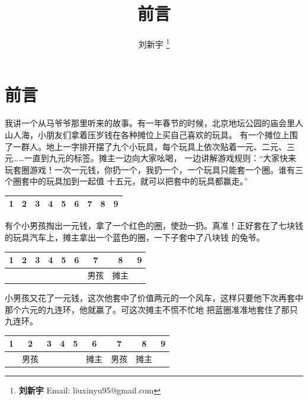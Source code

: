 \documentclass[UTF8]{article}
\begin{document}
\title{前言}

\author{刘新宇
\thanks{{\bfseries 刘新宇} \newline
  Email: liuxinyu95@gmail.com \newline}
  }

\maketitle
\fi


\chapter*{前言}

我讲一个从马爷爷那里听来的故事。有一年春节的时候，北京地坛公园的庙会里人山人海，小朋友们拿着压岁钱在各种摊位上买自己喜欢的玩具。
有一个摊位上围了一群人。地上一字排开摆了九个小玩具，每个玩具上依次贴着一元、二元、三元……一直到九元的标签。摊主一边向大家吆喝，
一边讲解游戏规则：“大家快来玩套圈游戏！一次一元钱，你扔一个，我扔一个，一个玩具只能套一个圈。谁有三个圈套中的玩具加到一起值
十五元，就可以把套中的玩具都赢走。”

\vspace{5mm}
\begin{tabular}{|c|c|c|c|c|c|c|c|c|}
\hline
1 & 2 & 3 & 4 & 5 & 6 & 7 & 8 & 9 \\
\hline
\end{tabular}
\vspace{5mm}

有个小男孩掏出一元钱，拿了一个红色的圈，使劲一扔。真准！正好套在了七块钱的玩具汽车上，摊主拿出一个蓝色的圈，一下子套中了八块钱
的兔爷。

\vspace{5mm}
\begin{tabular}{|c|c|c|c|c|c|c|c|c|}
\hline
1 & 2 & 3 & 4 & 5 & 6 & 7 & 8 & 9 \\
\hline
  &   &   &   &   &   & 男孩 & 摊主 & \\
\hline
\end{tabular}
\vspace{5mm}

小男孩又花了一元钱，这次他套中了价值两元的一个风车，这样只要他下次再套中那个六元的九连环，他就赢了。可这次摊主不慌不忙地
把蓝圈准准地套住了那只九连环。

\vspace{5mm}
\begin{tabular}{|c|c|c|c|c|c|c|c|c|}
\hline
1 & 2 & 3 & 4 & 5 & 6 & 7 & 8 & 9 \\
\hline
  & 男孩  &   &   &   & 摊主  & 男孩 & 摊主 & \\
\hline
\end{tabular}
\vspace{5mm}
\end{document}
